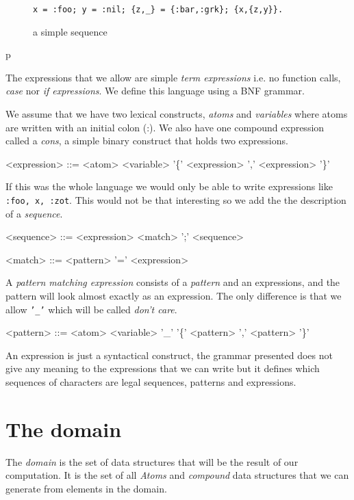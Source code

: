 \documentclass[a4paper,11pt]{article}
\begin{document}
\begin{figure}[ht]
\center
{\tt x = :foo; y = :nil; \{z,_\} = \{:bar,:grk\}; \{x,\{z,y\}\}.}
\caption{a simple sequence}
\label{fig:seq1}
\end{figure}p

The expressions that we allow are simple {\em term expressions}
i.e. no function calls, {\em case} nor {\em if expressions}. We define
this language using a BNF grammar.

We assume that we have two lexical constructs, {\em atoms} and {\em
  variables} where atoms are written with an initial colon (:). We also
have one compound expression called a {\em cons}, a simple binary
construct that holds two expressions.

\begin{grammar}
<expression> ::= <atom> \alt <variable> \alt '\{' <expression> ',' <expression> '\}'
\end{grammar}

If this was the whole language we would only be able to write
expressions like {\tt {:foo, {x, :zot}}}. This would not be that
interesting so we add the the description of a {\em sequence}.

\begin{grammar}
<sequence> ::= <expression> \alt <match> ';' <sequence>

<match> ::= <pattern> '=' <expression> 
\end{grammar}


A {\em pattern matching expression} consists of a {\em pattern} and an
expressions, and the pattern will look almost exactly as an
expression. The only difference is that we allow {\tt '_'} which will
be called {\em don't care}.

\begin{grammar}
<pattern> ::= <atom>
\alt <variable>
\alt '_'  
\alt '\{' <pattern> ',' <pattern> '\}' 
\end{grammar}

An expression is just a syntactical construct, the grammar presented
does not give any meaning to the expressions that we can write but it
defines which sequences of characters are legal sequences, patterns
and expressions.

\section{The domain}

The {\em domain} is the set of data structures that will be the result
of our computation. It is the set of all {\em Atoms} and {\em
  compound} data structures that we can generate from elements in the
domain.
\end{document}
